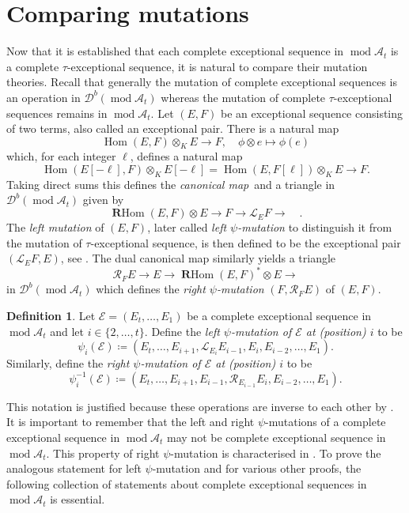 \documentclass[10pt,twoside, a4paper,reqno]{amsart}
\DeclareMathOperator{\mods}{mod}
\DeclareMathOperator{\Hom}{Hom}
\DeclareMathOperator{\RHom}{\textbf{R}Hom}
\newcommand{\A}{\mathscr{A}}
\newcommand{\Dcal}{\mathcal{D}}
\newcommand{\Ecal}{\mathcal{E}}
\newcommand{\Lcal}{\mathcal{L}}
\newcommand{\Rcal}{\mathcal{R}}
\theoremstyle{definition}
\newtheorem{definition}[theorem]{Definition}
\begin{document}
\section{Comparing mutations}\label{sec:mutation}
Now that it is established that each complete exceptional sequence in $\mods \A_t$ is a complete $\tau$-exceptional sequence, it is natural to compare their mutation theories. Recall that generally the mutation of complete exceptional sequences is an operation in $\Dcal^b(\mods \A_t)$ whereas the mutation of complete $\tau$-exceptional sequences remains in $\mods \A_t$. Let $(E,F)$ be an exceptional sequence consisting of two terms, also called an exceptional pair. There is a natural map
\[ \Hom(E,F) \otimes_K E \to F, \quad \phi \otimes e \mapsto \phi(e) \]
which, for each integer $\ell$, defines a natural map
\[ \Hom(E[-\ell ],F) \otimes_K E[-\ell] = \Hom(E, F[\ell]) \otimes_K E \to F. \]
Taking direct sums this defines the \textit{canonical map} and a triangle in $\Dcal^b(\mods \A_t)$ given by
\begin{equation}\label{eq:leftmutexcep} \RHom(E,F) \otimes E \to F \to \mathcal{L}_E F \to  \quad .\end{equation}
The \textit{left mutation} of $(E,F)$, later called \textit{left $\psi$-mutation} to distinguish it from the mutation of $\tau$-exceptional sequence, is then defined to be the exceptional pair $(\Lcal_E F, E)$, see \cite[Sec. 2.2]{Gorodentsev1990}. The dual canonical map similarly yields a triangle
\[ \mathcal{R}_F E \to E \to \RHom(E,F)^* \otimes E \to \]
in $\Dcal^b(\mods \A_t)$ which defines the \textit{right $\psi$-mutation} $(F, \Rcal_F E)$ of $(E,F)$. 

\begin{definition}\label{def:completeexcepmut}
    Let $\Ecal = (E_t, \dots, E_1)$ be a complete exceptional sequence in $\mods \A_t$ and let $i \in \{2, \dots, t\}$. Define the \textit{left $\psi$-mutation of $\Ecal$ at (position) $i$} to be
    \[ \psi_i(\Ecal) \coloneqq (E_t, \dots, E_{i+1}, \Lcal_{E_i} E_{i-1}, E_i, E_{i-2},\dots, E_1). \]
    Similarly, define the \textit{right $\psi$-mutation of $\Ecal$ at (position) $i$} to be 
    \[ \psi_i^{-1}(\Ecal) \coloneqq (E_t, \dots, E_{i+1}, E_{i-1}, \Rcal_{E_{i-1}} {E}_i, E_{i-2}, \dots, E_1). \] 
\end{definition}

This notation is justified because these operations are inverse to each other by \cite[Sec. 2.3]{Gorodentsev1990}. It is important to remember that the left and right $\psi$-mutations of a complete exceptional sequence in $\mods \A_t$ may not be complete exceptional sequence in $\mods \A_t$. This property of right $\psi$-mutation is characterised in \cite[Lem. 4.7, Cor. 4.8]{HillePloog2019}. To prove the analogous statement for left $\psi$-mutation and for various other proofs, the following collection of statements about complete exceptional sequences in $\mods \A_t$ is essential.
\end{document}
